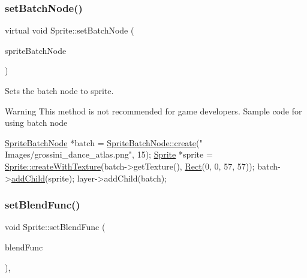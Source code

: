 \subsubsection{\texorpdfstring{set\+Batch\+Node()}{setBatchNode()}\hspace{0.1cm}{\footnotesize\ttfamily [2/2]}}
{\footnotesize\ttfamily virtual void Sprite\+::set\+Batch\+Node (\begin{DoxyParamCaption}\item[{\hyperlink{classSpriteBatchNode}{Sprite\+Batch\+Node} $\ast$}]{sprite\+Batch\+Node }\end{DoxyParamCaption})\hspace{0.3cm}{\ttfamily [virtual]}}

Sets the batch node to sprite. \begin{DoxyWarning}{Warning}
This method is not recommended for game developers. Sample code for using batch node 
\begin{DoxyCode}
\hyperlink{classSpriteBatchNode}{SpriteBatchNode} *batch = \hyperlink{classNode_aa9a92a1756b585d707a42c3fd1b274d4}{SpriteBatchNode::create}(\textcolor{stringliteral}{"
      Images/grossini\_dance\_atlas.png"}, 15);
\hyperlink{classSprite}{Sprite} *sprite = \hyperlink{classSprite_a8d9023960cc3b3d3b6c8109e0a778cdc}{Sprite::createWithTexture}(batch->getTexture(), 
      \hyperlink{classRect}{Rect}(0, 0, 57, 57));
batch->\hyperlink{classSpriteBatchNode_a4d84535b9cdc98d8cfbb8d978f84fc93}{addChild}(sprite);
layer->addChild(batch);
\end{DoxyCode}
 
\end{DoxyWarning}
\mbox{\label{classSprite_af78e53072fccdf0491c02098c55b282f}} 
\subsubsection{\texorpdfstring{set\+Blend\+Func()}{setBlendFunc()}\hspace{0.1cm}{\footnotesize\ttfamily [1/2]}}
{\footnotesize\ttfamily void Sprite\+::set\+Blend\+Func (\begin{DoxyParamCaption}\item[{const \hyperlink{structBlendFunc}{Blend\+Func} \&}]{blend\+Func }\end{DoxyParamCaption})\hspace{0.3cm}{\ttfamily [inline]}, {\ttfamily [override]}}


